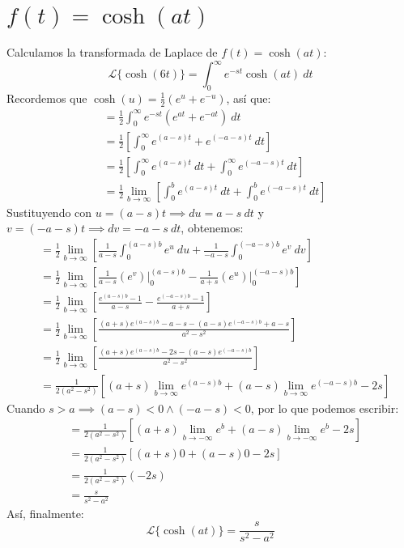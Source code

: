 \documentclass[12pt, a4paper]{article}
\begin{document}
\setcounter{section}{16}
\section{\texorpdfstring{\(f(t)=\cosh(at)\)}{f (t) = cosh (at)}}

Calculamos la transformada de Laplace de \(f(t) = \cosh(at)\):
\[
	\mathcal{L}\{\cosh(6t)\} = \int_{0}^{\infty} e^{-st} \cosh(at) \ dt
\]
Recordemos que \(\cosh(u) = \frac{1}{2} \left( e^{u} + e^{-u} \right) \), así que:
\begin{align*}
	&= \frac{1}{2} \int_{0}^{\infty} e^{-st} \left( e^{at} + e^{-at} \right)  \ dt \\
	&= \frac{1}{2} \left[ \int_{0}^{\infty} e^{(a-s)t} + e^{(-a-s)t} \ dt \right] \\
	&= \frac{1}{2} \left[ \int_{0}^{\infty} e^{(a-s)t} \ dt + \int_{0}^{\infty} e^{(-a-s)t} \ dt \right] \\
	&= \frac{1}{2} \lim_{b \to \infty} \left[ \int_{0}^{b} e^{(a-s)t} \ dt + \int_{0}^{b} e^{(-a-s)t} \ dt \right]
\end{align*}
Sustituyendo con \(u = (a-s)t \implies du = a-s\ dt\) y \(v = (-a-s)t \implies dv = -a-s\ dt\), obtenemos:
\begin{align*}
	&= \frac{1}{2} \lim_{b \to \infty} \left[ \frac{1}{a-s} \int_{0}^{(a-s)b} e^{u} \ du + \frac{1}{-a-s} \int_{0}^{(-a-s)b} e^{v} \ dv \right] \\
	&= \frac{1}{2} \lim_{b \to \infty} \left[ \frac{1}{a-s} \left. \left( e^{v} \right) \right|_{0}^{(a-s)b} - \frac{1}{a+s} \left. \left( e^{u} \right) \right|_{0}^{(-a-s)b} \right] \\
	&= \frac{1}{2} \lim_{b \to \infty} \left[ \frac{e^{(a-s)b} - 1}{a-s} - \frac{e^{(-a-s)b} - 1}{a+s} \right] \\
	&= \frac{1}{2} \lim_{b \to \infty} \left[ \frac{(a+s) e^{(a-s)b} - a - s - (a-s)e^{(-a-s)b} + a - s}{a^{2} - s ^{2}} \right] \\
	&= \frac{1}{2} \lim_{b \to \infty} \left[ \frac{(a+s) e^{(a-s)b} - 2s - (a-s)e^{(-a-s)b}}{a^{2}-s ^{2}} \right] \\
	&= \frac{1}{2(a^{2}-s ^{2})} \left[ (a+s) \lim_{b \to \infty} e^{(a-s)b} + (a-s) \lim_{b \to \infty} e^{(-a-s)b} - 2s \right]
\end{align*}
Cuando \(s > a \implies (a-s) < 0 \land (-a-s) < 0\), por lo que podemos escribir:
\begin{align*}
	&= \frac{1}{2(a^{2}-s ^{2})} \left[ (a+s) \lim_{b \to -\infty} e^{b} + (a-s) \lim_{b \to -\infty} e^{b} - 2s \right] \\
	&= \frac{1}{2(a^{2}-s ^{2})} \left[ (a+s) 0 + (a-s) 0 - 2s \right] \\
	&= \frac{1}{2(a^{2}-s ^{2})} (-2s) \\
	&= \frac{s}{s ^{2} - a^{2}}
\end{align*}
Así, finalmente:
\[
	\mathcal{L}\{\cosh(at)\} = \frac{s}{s ^{2} - a^{2}}
\]
\end{document}
